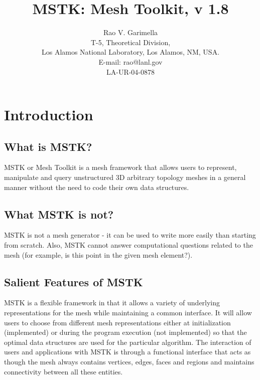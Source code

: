 \documentclass[12pt]{article}
\begin{document}
\title{MSTK: Mesh Toolkit, v 1.8} 


\author{Rao V. Garimella \\
  T-5, Theoretical Division, \\
  Los Alamos National Laboratory, Los Alamos, NM, USA. \\ E-mail:
  rao@lanl.gov \\
  \vspace{5em}
  LA-UR-04-0878}

\maketitle

\thispagestyle{empty}
\setlength{\parindent}{0.0in}
\setlength{\parskip}{0.5em}

\newpage
\section{Introduction}

\subsection{What is MSTK?}
MSTK or Mesh Toolkit is a mesh framework that allows users to
represent, manipulate and query unstructured 3D arbitrary topology
meshes in a general manner without the need to code their own data
structures. 

\subsection{What MSTK is not?}

MSTK is not a mesh generator - it can be used to write more easily
than starting from scratch. Also, MSTK cannot answer computational
questions related to the mesh (for example, is this point in the given
mesh element?).

\subsection{Salient Features of MSTK}

MSTK is a flexible framework in that it allows a variety
of underlying representations for the mesh while maintaining a common
interface. It will allow users to choose from different mesh
representations either at initialization (implemented) or during the
program execution (not implemented) so that the optimal data
structures are used for the particular algorithm. The interaction of
users and applications with MSTK is through a functional interface
that acts as though the mesh always contains vertices, edges, faces
and regions and maintains connectivity between all these entities.
\end{document}
